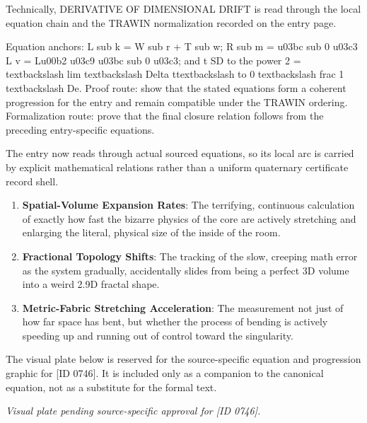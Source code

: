 Technically, DERIVATIVE OF DIMENSIONAL DRIFT is read through the local equation chain and the TRAWIN normalization recorded on the entry page.

Equation anchors: L sub k = W sub r + T sub w; R sub m = u03bc sub 0 u03c3 L v = Lu00b2 u03c9 u03bc sub 0 u03c3; and t SD to the power 2 = textbackslash lim textbackslash Delta ttextbackslash to 0 textbackslash frac 1 textbackslash De. Proof route: show that the stated equations form a coherent progression for the entry and remain compatible under the TRAWIN ordering. Formalization route: prove that the final closure relation follows from the preceding entry-specific equations.

The entry now reads through actual sourced equations, so its local arc is carried by explicit mathematical relations rather than a uniform quaternary certificate record shell.
\endgroup

\begin{enumerate}[leftmargin=1.6em,itemsep=6pt,topsep=4pt]
\item \textbf{Spatial-Volume Expansion Rates}: The terrifying, continuous calculation of exactly how fast the bizarre physics of the core are actively stretching and enlarging the literal, physical size of the inside of the room.
\item \textbf{Fractional Topology Shifts}: The tracking of the slow, creeping math error as the system gradually, accidentally slides from being a perfect 3D volume into a weird 2.9D fractal shape.
\item \textbf{Metric-Fabric Stretching Acceleration}: The measurement not just of how far space has bent, but whether the process of bending is actively speeding up and running out of control toward the singularity.
\end{enumerate}

\begingroup\footnotesize\sloppy
The visual plate below is reserved for the source-specific equation and progression graphic for [ID 0746]. It is included only as a companion to the canonical equation, not as a substitute for the formal text.
\par\endgroup
\begingroup\footnotesize\itshape
Visual plate pending source-specific approval for [ID 0746].
\par\endgroup

